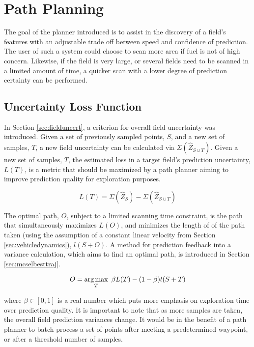 \chapter{Path Planning} \label{ch:pp}
The goal of the planner introduced is to assist in the discovery of a field's features with an adjustable trade off between speed and confidence of prediction. The user of such a system could choose to scan more area if fuel is not of high concern. Likewise, if the field is very large, or several fields need to be scanned in a limited amount of time, a quicker scan with a lower degree of prediction certainty can be performed.

\section{Uncertainty Loss Function} \label{sec:lossfunc}
In Section \ref{sec:fielduncert}, a criterion for overall field uncertainty was introduced. Given a set of previously sampled points, $S$, and a new set of samples, $T$, a new field uncertainty can be calculated via $\Sigma(\hat{Z}_{S \cup T})$. Given a new set of samples, $T$, the estimated loss in a target field's prediction uncertainty, $L(T)$, is a metric that should be maximized by a path planner aiming to improve prediction quality for exploration purposes.

\begin{equation}
	L(T) = \Sigma(\hat{Z}_{S}) - \Sigma(\hat{Z}_{S \cup T})
	\label{eq:lossfunc}
\end{equation}

The optimal path, $O$, subject to a limited scanning time constraint, is the path that simultaneously maximizes $L(O)$, and minimizes the length of of the path taken (using the assumption of a constant linear velocity from Section \ref{sec:vehicledynamics}), $l(S + O)$. A method for prediction feedback into a variance calculation, which aims to find an optimal path, is introduced in Section \ref{sec:mcselbesttraj}.

\begin{equation}
	O = \operatorname*{arg\,max}_T\ \beta L(T) - (1-\beta)l(S + T)
\end{equation}

\noindent where $\beta \in [0,1]$ is a real number which puts more emphasis on exploration time over prediction quality. It is important to note that as more samples are taken, the overall field prediction variances change. It would be in the benefit of a path planner to batch process a set of points after meeting a predetermined waypoint, or after a threshold number of samples. 

